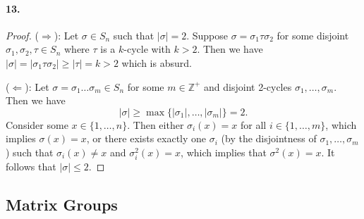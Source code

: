 \documentclass{article}
\begin{document}
\paragraph{13.}
\begin{proof}
  ($\Rightarrow$): Let $\sigma \in S_n$ such that $|\sigma| = 2$. Suppose
  $\sigma = \sigma_1\tau\sigma_2$ for some disjoint $\sigma_1, \sigma_2, \tau
  \in S_n$ where $\tau$ is a $k$-cycle with $k > 2$. Then we have $|\sigma| =
  |\sigma_1\tau\sigma_2| \geq |\tau| = k > 2$ which is absurd.

  ($\Leftarrow$): Let $\sigma = \sigma_1\ldots\sigma_m \in S_n$ for some $m \in
  \mathbb{Z}^+$ and disjoint 2-cycles $\sigma_1, \ldots, \sigma_m$. Then we have
  \[
    |\sigma| \geq \max\{|\sigma_1|, \ldots, |\sigma_m|\} = 2.
  \] Consider some $x \in \{1, \ldots, n\}$. Then either $\sigma_i(x) = x$
  for all $i \in \{1, \ldots, m\}$, which implies $\sigma(x) = x$, or there
  exists exactly one $\sigma_i$ (by the disjointness of $\sigma_1, \ldots,
  \sigma_m$) such that $\sigma_i(x) \neq x$ and $\sigma_i^2(x) = x$, which
  implies that $\sigma^2(x) = x$. It follows that $|\sigma| \leq 2$.
\end{proof}

\subsection{Matrix Groups}
\end{document}
